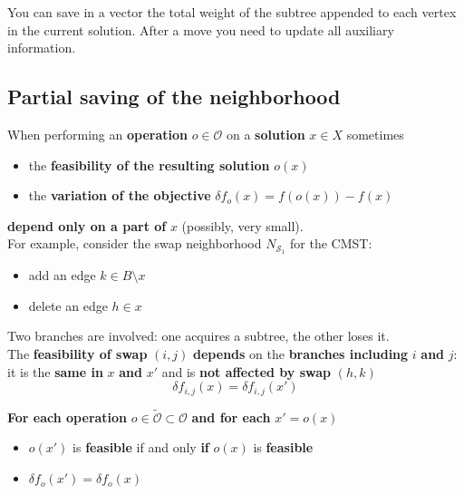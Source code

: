 \documentclass[11pt]{article}
\begin{document}
	You can save in a vector the total weight of the subtree appended to each vertex in the current solution. After a move you need to update all auxiliary information.\\
	
	\newpage
	
	\subsection{Partial saving of the neighborhood}
	
	When performing an \textbf{operation} $o \in \mathcal{O}$ on a \textbf{solution} $x \in X$ sometimes
	\begin{itemize}
		\item the \textbf{feasibility of the resulting solution} $o (x)$
		\item the \textbf{variation of the objective} $\delta f_o (x) = f (o(x)) − f (x)$
	\end{itemize}
	\textbf{depend only on a part of} $x$ (possibly, very small).\\
	
	For example, consider the swap neighborhood $N_{\mathcal{S}_1}$ for the CMST:
	\begin{itemize}
		\item add an edge $k \in B \setminus x$
		\item delete an edge $h \in x$
	\end{itemize}
	Two branches are involved: one acquires a subtree, the other loses it.\\
	
	The \textbf{feasibility of swap} $(i, j)$ \textbf{depends} on the \textbf{branches including} $i$ \textbf{and} $j$: it is the \textbf{same in} $x$ \textbf{and} $x'$ and is \textbf{not affected by swap} $(h, k)$
	$$ \delta f_{i,j} (x) = \delta f_{i,j} (x') $$
	
	\textbf{For each operation} $o ∈ \tilde{\mathcal{O}} \subset \mathcal{O}$ \textbf{and for each} $x' = o (x)$
	\begin{itemize}
		\item $o (x')$ is \textbf{feasible} if and only \textbf{if} $o (x)$ is \textbf{feasible}
		\item $\delta f_o (x') = \delta f_o (x)$
	\end{itemize}
	
\end{document}
